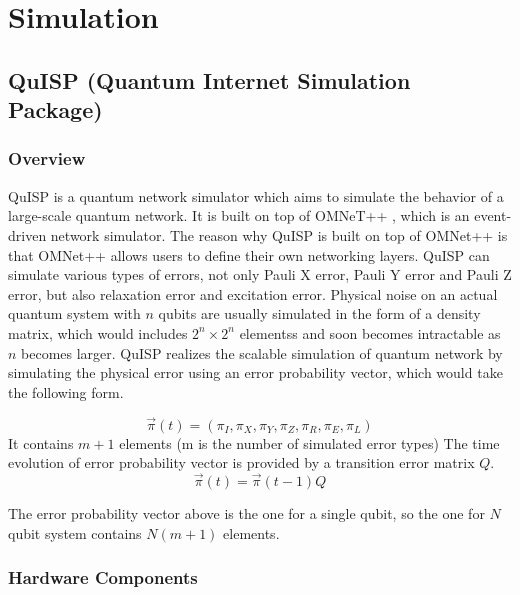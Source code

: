 \chapter{Simulation}
\label{simulation}

\section{QuISP (Quantum Internet Simulation Package)}

\subsection{Overview}

QuISP \cite{satoh2022quisp} is a quantum network simulator which aims to simulate the behavior of a large-scale quantum network. It is built on top of OMNeT++ \cite{10.5555/1416222.1416290}, which is an event-driven network simulator.
The reason why QuISP is built on top of OMNet++ is that OMNet++ allows users to define their own networking layers.
QuISP can simulate various types of errors, not only Pauli X error, Pauli Y error and Pauli Z error, but also relaxation error and excitation error.
Physical noise on an actual quantum system with $n$ qubits are usually simulated in the form of a density matrix, which would includes $2^n \times 2^n$ elementss and soon becomes intractable as $n$ becomes larger.
QuISP realizes the scalable simulation of quantum network by simulating the physical error using an error probability vector, which would take the following form.

\begin{equation}
  \overrightarrow{\pi}(t) = (\pi_I, \pi_X, \pi_Y, \pi_Z, \pi_R, \pi_E, \pi_L)
\end{equation}
It contains $m+1$ elements (m is the number of simulated error types)
The time evolution of error probability vector is provided by a transition error matrix $Q$.
\begin{equation}
  \overrightarrow{\pi}(t) = \overrightarrow{\pi}(t-1)Q 
\end{equation}

The error probability vector above is the one for a single qubit, so the one for $N$ qubit system contains $N(m+1)$ elements.

\subsection{Hardware Components}

